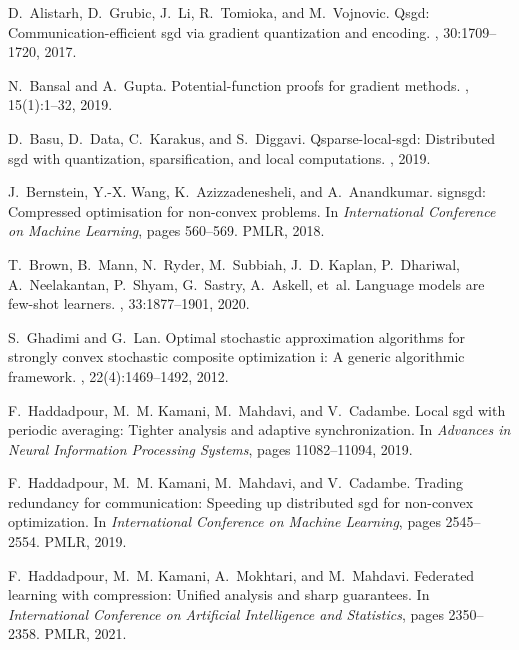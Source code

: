 \documentclass[11pt]{article}
\begin{document}
\begin{thebibliography}{10}

D.~Alistarh, D.~Grubic, J.~Li, R.~Tomioka, and M.~Vojnovic.
\newblock Qsgd: Communication-efficient sgd via gradient quantization and
  encoding.
,
  30:1709--1720, 2017.

N.~Bansal and A.~Gupta.
\newblock Potential-function proofs for gradient methods.
, 15(1):1--32, 2019.

D.~Basu, D.~Data, C.~Karakus, and S.~Diggavi.
\newblock Qsparse-local-sgd: Distributed sgd with quantization, sparsification,
  and local computations.
, 2019.

J.~Bernstein, Y.-X. Wang, K.~Azizzadenesheli, and A.~Anandkumar.
\newblock signsgd: Compressed optimisation for non-convex problems.
\newblock In {\em International Conference on Machine Learning}, pages
  560--569. PMLR, 2018.

T.~Brown, B.~Mann, N.~Ryder, M.~Subbiah, J.~D. Kaplan, P.~Dhariwal,
  A.~Neelakantan, P.~Shyam, G.~Sastry, A.~Askell, et~al.
\newblock Language models are few-shot learners.
,
  33:1877--1901, 2020.

S.~Ghadimi and G.~Lan.
\newblock Optimal stochastic approximation algorithms for strongly convex
  stochastic composite optimization i: A generic algorithmic framework.
, 22(4):1469--1492, 2012.

F.~Haddadpour, M.~M. Kamani, M.~Mahdavi, and V.~Cadambe.
\newblock Local sgd with periodic averaging: Tighter analysis and adaptive
  synchronization.
\newblock In {\em Advances in Neural Information Processing Systems}, pages
  11082--11094, 2019.

F.~Haddadpour, M.~M. Kamani, M.~Mahdavi, and V.~Cadambe.
\newblock Trading redundancy for communication: Speeding up distributed sgd for
  non-convex optimization.
\newblock In {\em International Conference on Machine Learning}, pages
  2545--2554. PMLR, 2019.

F.~Haddadpour, M.~M. Kamani, A.~Mokhtari, and M.~Mahdavi.
\newblock Federated learning with compression: Unified analysis and sharp
  guarantees.
\newblock In {\em International Conference on Artificial Intelligence and
  Statistics}, pages 2350--2358. PMLR, 2021.


\end{thebibliography}
\end{document}

